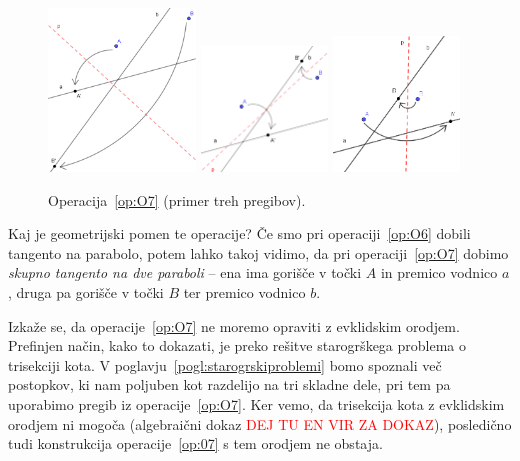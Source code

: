 \begin{figure}[h]
    \centering
    \includegraphics[width=0.35\textwidth]{images/origami_operacije/O7b.png}
    \includegraphics[width=0.3\textwidth]{images/origami_operacije/O7a.png}
    \includegraphics[width=0.3\textwidth]{images/origami_operacije/O7c.png}
    \caption[Operacija~\ref{op:O7}]{Operacija~\ref{op:O7} (primer treh pregibov).}
    \label{fig:O7}
\end{figure}

Kaj je geometrijski pomen te operacije? Če smo pri operaciji~\ref{op:O6} dobili tangento na parabolo, potem lahko takoj vidimo, da pri operaciji~\ref{op:O7} dobimo \emph{skupno tangento na dve paraboli} -- ena ima gorišče v točki $A$ in premico vodnico $a$, druga pa gorišče v točki $B$ ter premico vodnico $b$.

Izkaže se, da operacije~\ref{op:O7} ne moremo opraviti z evklidskim orodjem. Prefinjen način, kako to dokazati, je preko rešitve starogrškega problema o trisekciji kota. V poglavju~\ref{pogl:starogrskiproblemi} bomo spoznali več postopkov, ki nam poljuben kot razdelijo na tri skladne dele, pri tem pa uporabimo pregib iz operacije~\ref{op:O7}. Ker vemo, da trisekcija kota z evklidskim orodjem ni mogoča (algebraični dokaz \textcolor{red}{DEJ TU EN VIR ZA DOKAZ}), posledično tudi konstrukcija operacije~\ref{op:07} s tem orodjem ne obstaja.

